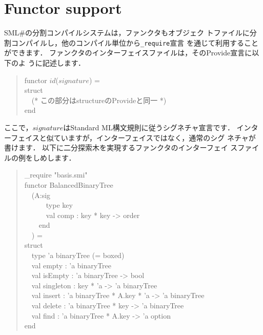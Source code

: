 \documentclass{jbook}
\newif\ifjp
\newcommand{\txt}[2]{#2}
\newcommand{\smlsharp}{SML\#}
\newcommand{\myem}{\mbox{\ \ }}
\newenvironment{program}{\begin{quote}\begin{tt}}%
                        {\end{tt}\end{quote}}
\begin{document}
\section{\txt{ファンクタのサポート}{Functor support}}
\label{sec:tutorialFunctorInInterface}

\ifjp%
	\smlsharp{}の分割コンパイルシステムは，ファンクタもオブジェク
トファイルに分割コンパイルし，他のコンパイル単位から{\tt \_require}宣言
を通じて利用することができます．
	ファンクタのインターフェイスファイルは，そのProvide宣言に以下のよ
うに記述します．
\begin{program}
functor $id$($signature$) =\\
struct\\
\myem (* この部分はstructureのProvideと同一 *)\\
end
\end{program}
	ここで，$signature$はStandard ML構文規則に従うシグネチャ宣言です．
	インターフェイスと似ていますが，インターフェイスではなく，通常のシグ
ネチャが書けます．
	以下に二分探索木を実現するファンクタのインターフェイ
スファイルの例をしめします．
\begin{program}
\_require "basis.smi"\\
functor BalancedBinaryTree\\
\myem  (A:sig\\
\myem\myem\myem      type key\\
\myem\myem\myem      val comp : key * key -> order\\
\myem\myem    end\\
\myem  ) =\\
struct\\
\myem type 'a binaryTree (= boxed)\\
\myem  val empty : 'a binaryTree\\
\myem  val isEmpty : 'a binaryTree -> bool\\
\myem  val singleton : key * 'a -> 'a binaryTree\\
\myem  val insert : 'a binaryTree * A.key * 'a -> 'a binaryTree\\
\myem  val delete : 'a binaryTree * key -> 'a binaryTree\\
\myem  val find : 'a binaryTree * A.key -> 'a option\\
end
\end{program}
\end{document}
